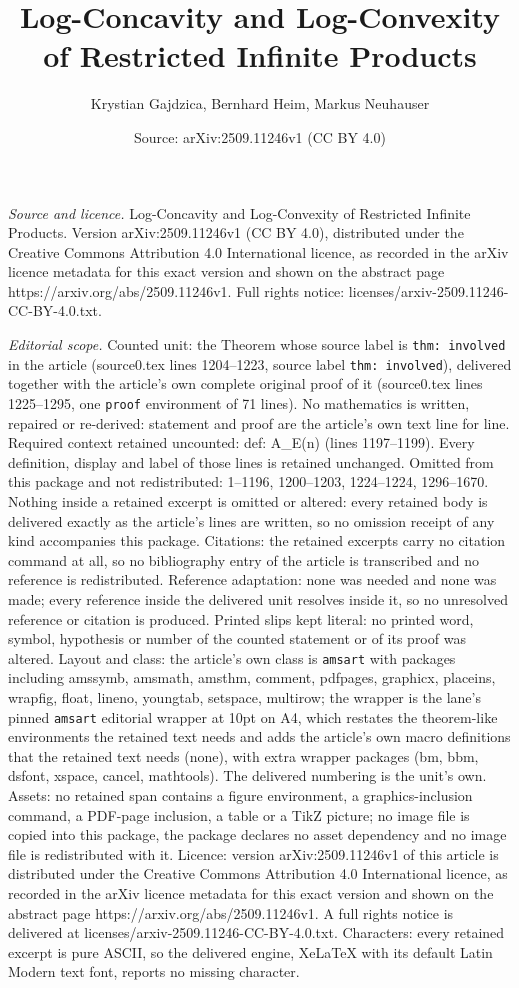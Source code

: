 \documentclass[10pt,a4paper]{amsart}
\title[Log-Concavity and Log-Convexity of Restricted Infinite Produ]{Log-Concavity and Log-Convexity of Restricted Infinite Products}
\author{Krystian Gajdzica, Bernhard Heim, Markus Neuhauser}
\date{Source: arXiv:2509.11246v1 (CC BY 4.0)}
\begin{document}
\maketitle

\noindent\emph{Source and licence.} Log-Concavity and Log-Convexity of Restricted Infinite Products. Version arXiv:2509.11246v1 (CC BY 4.0), distributed under the Creative Commons Attribution 4.0 International licence, as recorded in the arXiv licence metadata for this exact version and shown on the abstract page https://arxiv.org/abs/2509.11246v1. Full rights notice: licenses/arxiv-2509.11246-CC-BY-4.0.txt.\par\smallskip

\noindent\textit{Editorial scope.} Counted unit: the Theorem whose source label is \texttt{thm: involved} in the article (source0.tex lines 1204--1223, source label \texttt{thm: involved}), delivered together with the article's own complete original proof of it (source0.tex lines 1225--1295, one \texttt{proof} environment of 71 lines). No mathematics is written, repaired or re-derived: statement and proof are the article's own text line for line. Required context retained uncounted: def: A\_E(n) (lines 1197--1199). Every definition, display and label of those lines is retained unchanged. Omitted from this package and not redistributed: 1--1196, 1200--1203, 1224--1224, 1296--1670. Nothing inside a retained excerpt is omitted or altered: every retained body is delivered exactly as the article's lines are written, so no omission receipt of any kind accompanies this package. Citations: the retained excerpts carry no citation command at all, so no bibliography entry of the article is transcribed and no reference is redistributed. Reference adaptation: none was needed and none was made; every reference inside the delivered unit resolves inside it, so no unresolved reference or citation is produced. Printed slips kept literal: no printed word, symbol, hypothesis or number of the counted statement or of its proof was altered. Layout and class: the article's own class is \texttt{amsart} with packages including amssymb, amsmath, amsthm, comment, pdfpages, graphicx, placeins, wrapfig, float, lineno, youngtab, setspace, multirow; the wrapper is the lane's pinned \texttt{amsart} editorial wrapper at 10pt on A4, which restates the theorem-like environments the retained text needs and adds the article's own macro definitions that the retained text needs (none), with extra wrapper packages (bm, bbm, dsfont, xspace, cancel, mathtools). The delivered numbering is the unit's own. Assets: no retained span contains a figure environment, a graphics-inclusion command, a PDF-page inclusion, a table or a TikZ picture; no image file is copied into this package, the package declares no asset dependency and no image file is redistributed with it. Licence: version arXiv:2509.11246v1 of this article is distributed under the Creative Commons Attribution 4.0 International licence, as recorded in the arXiv licence metadata for this exact version and shown on the abstract page https://arxiv.org/abs/2509.11246v1. A full rights notice is delivered at licenses/arxiv-2509.11246-CC-BY-4.0.txt. Characters: every retained excerpt is pure ASCII, so the delivered engine, XeLaTeX with its default Latin Modern text font, reports no missing character.
\end{document}
